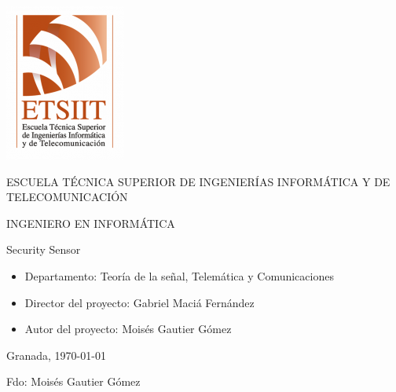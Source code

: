\pagestyle{empty}
\begin{center}

  \includegraphics[scale=.5]{logo_ugr.png} \\

  \vspace{2.0cm}

  \Large{ESCUELA TÉCNICA SUPERIOR DE INGENIERÍAS INFORMÁTICA Y DE TELECOMUNICACIÓN} \\

  \vspace{1.0cm}

  \large{INGENIERO EN INFORMÁTICA} \\

  \vspace{2.0cm}

  \large{Security Sensor}

  \vspace{1.0cm}

\end{center}

\begin{itemize}
\item \large{Departamento: Teoría de la señal, Telemática y Comunicaciones}
\item \large{Director del proyecto: Gabriel Maciá Fernández}
\item \large{Autor del proyecto: Moisés Gautier Gómez}
\end{itemize}

\vspace{1.0cm}

\begin{flushright}
  \large{Granada, \today} \\

  \vspace{2.5cm}

  \large{Fdo: Moisés Gautier Gómez}
\end{flushright}
